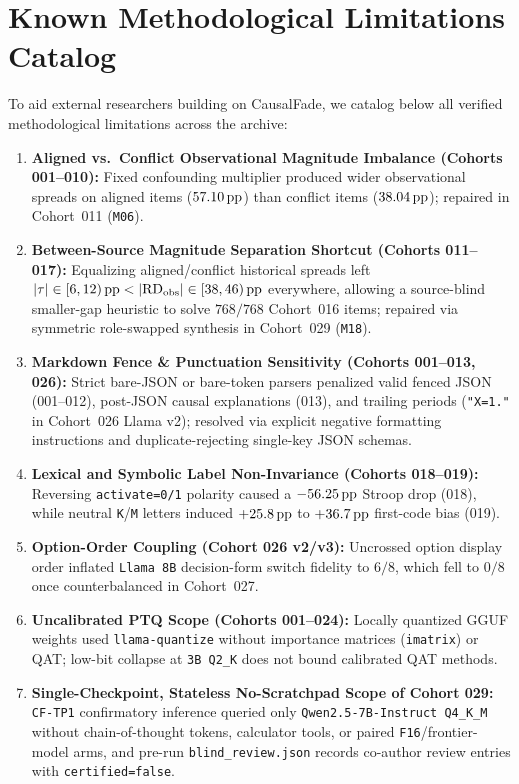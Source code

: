 \chapter{Known Methodological Limitations Catalog}\label{app:limitations}
To aid external researchers building on CausalFade, we catalog below all verified methodological limitations across the archive:
\begin{enumerate}
  \item \textbf{Aligned vs.\ Conflict Observational Magnitude Imbalance (Cohorts 001--010):} Fixed confounding multiplier produced wider observational spreads on aligned items ($57.10\,\mathrm{pp}$) than conflict items ($38.04\,\mathrm{pp}$); repaired in Cohort~011 (\texttt{M06}).
  \item \textbf{Between-Source Magnitude Separation Shortcut (Cohorts 011--017):} Equalizing aligned/conflict historical spreads left $|\tau| \in [6,12)\,\mathrm{pp} < |\mathrm{RD}_{\mathrm{obs}}| \in [38,46)\,\mathrm{pp}$ everywhere, allowing a source-blind smaller-gap heuristic to solve $768/768$ Cohort~016 items; repaired via symmetric role-swapped synthesis in Cohort~029 (\texttt{M18}).
  \item \textbf{Markdown Fence \& Punctuation Sensitivity (Cohorts 001--013, 026):} Strict bare-JSON or bare-token parsers penalized valid fenced JSON (001--012), post-JSON causal explanations (013), and trailing periods (\texttt{"X=1."} in Cohort~026 Llama v2); resolved via explicit negative formatting instructions and duplicate-rejecting single-key JSON schemas.
  \item \textbf{Lexical and Symbolic Label Non-Invariance (Cohorts 018--019):} Reversing \texttt{activate=0/1} polarity caused a $-56.25\,\mathrm{pp}$ Stroop drop (018), while neutral \texttt{K}/\texttt{M} letters induced $+25.8\,\mathrm{pp}$ to $+36.7\,\mathrm{pp}$ first-code bias (019).
  \item \textbf{Option-Order Coupling (Cohort 026 v2/v3):} Uncrossed option display order inflated \texttt{Llama 8B} decision-form switch fidelity to $6/8$, which fell to $0/8$ once counterbalanced in Cohort~027.
  \item \textbf{Uncalibrated PTQ Scope (Cohorts 001--024):} Locally quantized GGUF weights used \texttt{llama-quantize} without importance matrices (\texttt{imatrix}) or QAT; low-bit collapse at \texttt{3B Q2\_K} does not bound calibrated QAT methods.
  \item \textbf{Single-Checkpoint, Stateless No-Scratchpad Scope of Cohort 029:} \texttt{CF-TP1} confirmatory inference queried only \texttt{Qwen2.5-7B-Instruct Q4\_K\_M} without chain-of-thought tokens, calculator tools, or paired \texttt{F16}/frontier-model arms, and pre-run \texttt{blind\_review.json} records co-author review entries with \texttt{certified=false}.
\end{enumerate}

